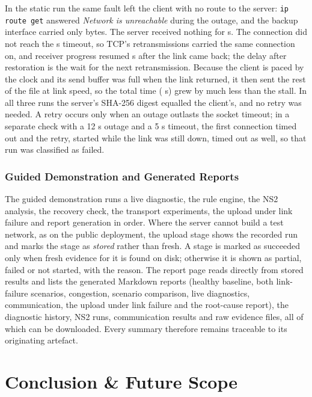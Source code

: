 \documentclass[12pt,a4paper]{report}
\numberwithin{equation}{chapter}
\begin{document}
In the static run the same fault left the client with no route to the server: \texttt{ip route get} answered \emph{Network is unreachable} during the outage, and the backup interface carried only \upStatBackupBytes{} bytes. The server received nothing for \upStatStall{} s. The connection did not reach the \upTimeout{} s timeout, so TCP's retransmissions carried the same connection on, and receiver progress resumed \upStatResume{} s after the link came back; the delay after restoration is the wait for the next retransmission. Because the client is paced by the clock and its send buffer was full when the link returned, it then sent the rest of the file at link speed, so the total time (\upStatTotal{} s) grew by much less than the stall. In all three runs the server's SHA-256 digest equalled the client's, and no retry was needed. A retry occurs only when an outage outlasts the socket timeout; in a separate check with a 12 s outage and a 5 s timeout, the first connection timed out and the retry, started while the link was still down, timed out as well, so that run was classified as failed.

\subsection{Guided Demonstration and Generated Reports}
The guided demonstration runs a live diagnostic, the rule engine, the NS2 analysis, the recovery check, the transport experiments, the upload under link failure and report generation in order. Where the server cannot build a test network, as on the public deployment, the upload stage shows the recorded run and marks the stage as \emph{stored} rather than fresh. A stage is marked as succeeded only when fresh evidence for it is found on disk; otherwise it is shown as partial, failed or not started, with the reason. The report page reads directly from stored results and lists the generated Markdown reports (healthy baseline, both link-failure scenarios, congestion, scenario comparison, live diagnostics, communication, the upload under link failure and the root-cause report), the diagnostic history, NS2 runs, communication results and raw evidence files, all of which can be downloaded. Every summary therefore remains traceable to its originating artefact.

\chapter{Conclusion \& Future Scope}
\end{document}
